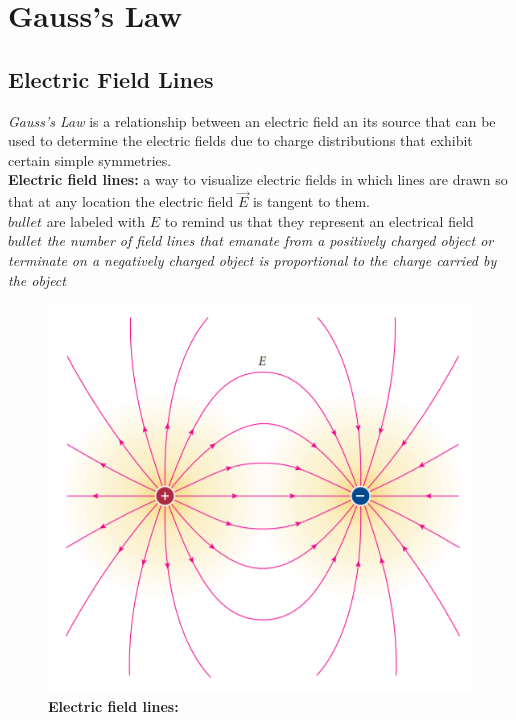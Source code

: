 \section{Gauss's Law}

    \subsection{Electric Field Lines}   %

        \textit{Gauss's Law} is a relationship between an electric field an its source that can be used to determine the electric fields due to charge distributions that exhibit certain simple symmetries. \\
        \textbf{Electric field lines:} a way to visualize electric fields in which lines are drawn so that at any location the electric field $\vec{E}$ is tangent to them. \\
        $bullet$ are labeled with $E$ to remind us that they represent an electrical field \\
        $bullet$ \textit{the number of field lines that emanate from a positively charged object or terminate on a negatively charged object is proportional to the charge carried by the object}

        \begin{figure}[hbt!]
            \centering
            \caption*{\textbf{Electric field lines:}}
            \includegraphics[scale = 0.75]{Resources/24.1_Electric_Field_Lines}
        \end{figure}

